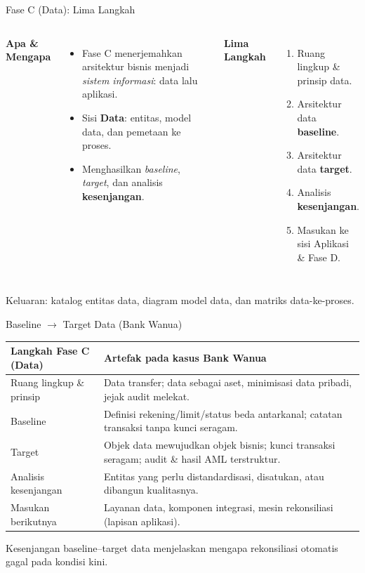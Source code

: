 \documentclass[aspectratio=169, table]{beamer}
\newcommand{\takeaway}[1]{%
  \vspace{4pt}
  {\footnotesize #1}
}
\begin{document}
\begin{frame}{Fase C (Data): Lima Langkah}
  \vspace{2pt}
  \footnotesize
  \begin{columns}[t]
    \textbf{Apa \& Mengapa}
    \begin{itemize}\setlength{\itemsep}{2.5pt}
      \item Fase C menerjemahkan arsitektur bisnis menjadi \emph{sistem
            informasi}: data lalu aplikasi.
      \item Sisi \textbf{Data}: entitas, model data, dan pemetaan ke proses.
      \item Menghasilkan \emph{baseline}, \emph{target}, dan analisis
            \textbf{kesenjangan}.
    \end{itemize}
    \textbf{Lima Langkah}
    \begin{enumerate}\setlength{\itemsep}{2.5pt}
      \item Ruang lingkup \& prinsip data.
      \item Arsitektur data \textbf{baseline}.
      \item Arsitektur data \textbf{target}.
      \item Analisis \textbf{kesenjangan}.
      \item Masukan ke sisi Aplikasi \& Fase D.
    \end{enumerate}
  \end{columns}
  \vspace{2pt}
  \takeaway{Keluaran: katalog entitas data, diagram model data, dan matriks
  data-ke-proses.}
\end{frame}

\begin{frame}{Baseline $\rightarrow$ Target Data (Bank Wanua)}
  \vspace{2pt}
  \scriptsize
  \setlength{\extrarowheight}{2pt}
  \setlength{\arrayrulewidth}{0.4pt}
  \begin{tabularx}{\textwidth}{|p{}|X|}
    \hline
    \rowcolor{blue!14}
    \textbf{Langkah Fase C (Data)} & \textbf{Artefak pada kasus Bank Wanua} \\
    \hline
    Ruang lingkup \& prinsip & Data transfer; data sebagai aset, minimisasi data pribadi, jejak audit melekat. \\
    \hline
    Baseline & Definisi rekening/limit/status beda antarkanal; catatan transaksi tanpa kunci seragam. \\
    \hline
    Target & Objek data mewujudkan objek bisnis; kunci transaksi seragam; audit \& hasil AML terstruktur. \\
    \hline
    Analisis kesenjangan & Entitas yang perlu distandardisasi, disatukan, atau dibangun kualitasnya. \\
    \hline
    Masukan berikutnya & Layanan data, komponen integrasi, mesin rekonsiliasi (lapisan aplikasi). \\
    \hline
  \end{tabularx}
  \vspace{4pt}
  \takeaway{Kesenjangan baseline--target data menjelaskan mengapa rekonsiliasi
  otomatis gagal pada kondisi kini.}
\end{frame}
\end{document}
